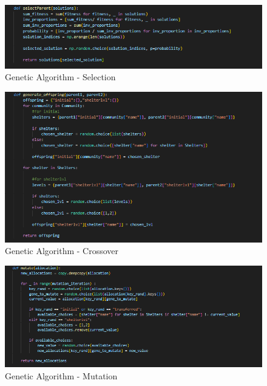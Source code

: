 \begin{appendices}
\begin{centerappendixtitle}
		\begin{figure}[h]
			\centering
			\caption{Genetic Algorithm - Selection}
			\label{selectionCode}
			\includegraphics[width=\linewidth]{appendix/selection}
		\end{figure}
		
		\begin{figure}[h]
			\centering
			\caption{Genetic Algorithm - Crossover}
			\label{crossoverCode}
			\includegraphics[width=\linewidth]{appendix/crossover}
		\end{figure}
		
		\begin{figure}[h]
			\centering
			\caption{Genetic Algorithm - Mutation}
			\label{mutationCode}
			\includegraphics[width=\linewidth]{appendix/mutate}
		\end{figure}
		

\end{centerappendixtitle}
\end{appendices}
